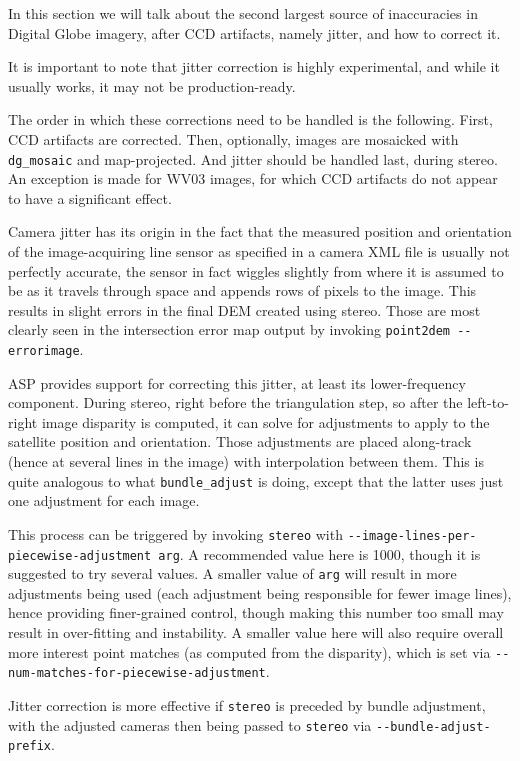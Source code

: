 In this section we will talk about the second largest source of
inaccuracies in Digital Globe imagery, after CCD artifacts, namely
jitter, and how to correct it. 

It is important to note that jitter correction is highly experimental,
and while it usually works, it may not be production-ready. 

The order in which these corrections need to be handled is the following. First,
CCD artifacts are corrected. Then, optionally, images are mosaicked with
\texttt{dg\_mosaic} and map-projected. And jitter should be handled
last, during stereo. An exception is made for WV03 images, for which CCD
artifacts do not appear to have a significant effect.

Camera jitter has its origin in the fact that the measured position and
orientation of the image-acquiring line sensor as specified in a camera
XML file is usually not perfectly accurate, the sensor in fact wiggles
slightly from where it is assumed to be as it travels through space and
appends rows of pixels to the image. This results in slight errors in
the final DEM created using stereo. Those are most clearly seen in the
intersection error map output by invoking \texttt{point2dem -\/-errorimage}.

ASP provides support for correcting this jitter, at least its
lower-frequency component. During stereo, right before the triangulation
step, so after the left-to-right image disparity is computed, it can
solve for adjustments to apply to the satellite position and
orientation. Those adjustments are placed along-track (hence at several
lines in the image) with interpolation between them. This is quite
analogous to what \texttt{bundle\_adjust} is doing, except that the
latter uses just one adjustment for each image.

This process can be triggered by invoking \texttt{stereo} with
\texttt{-\/-image-lines-per-piecewise-adjustment arg}. A recommended
value here is 1000, though it is suggested to try several values. A
smaller value of \texttt{arg} will result in more adjustments being used
(each adjustment being responsible for fewer image lines), hence
providing finer-grained control, though making this number too small may
result in over-fitting and instability. A smaller value here will also
require overall more interest point matches (as computed from the
disparity), which is set via
\texttt{-\/-num-matches-for-piecewise-adjustment}.

Jitter correction is more effective if \texttt{stereo} is preceded by
bundle adjustment, with the adjusted cameras then being passed to \texttt{stereo}
via \texttt{-\/-bundle-adjust-prefix}.

